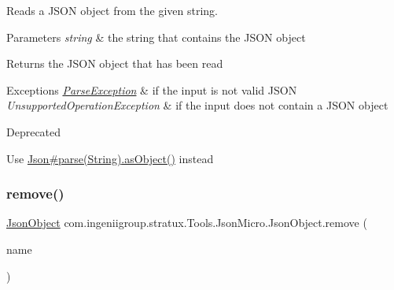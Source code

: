 Reads a J\+S\+ON object from the given string.


\begin{DoxyParams}{Parameters}
{\em string} & the string that contains the J\+S\+ON object \\
\hline
\end{DoxyParams}
\begin{DoxyReturn}{Returns}
the J\+S\+ON object that has been read 
\end{DoxyReturn}

\begin{DoxyExceptions}{Exceptions}
{\em \hyperlink{classcom_1_1ingeniigroup_1_1stratux_1_1_tools_1_1_json_micro_1_1_parse_exception}{Parse\+Exception}} & if the input is not valid J\+S\+ON \\
\hline
{\em Unsupported\+Operation\+Exception} & if the input does not contain a J\+S\+ON object \\
\hline
\end{DoxyExceptions}
\begin{DoxyRefDesc}{Deprecated}
\item[\hyperlink{deprecated__deprecated000004}{Deprecated}]Use \hyperlink{classcom_1_1ingeniigroup_1_1stratux_1_1_tools_1_1_json_micro_1_1_json_a0d4456dc115b1540337d2475ed2e3d55}{Json\#parse(\+String)}\hyperlink{classcom_1_1ingeniigroup_1_1stratux_1_1_tools_1_1_json_micro_1_1_json_value_a9b02091d2364f0e74a94ed5a6454ef9b}{.as\+Object()} instead \end{DoxyRefDesc}
\mbox{\label{classcom_1_1ingeniigroup_1_1stratux_1_1_tools_1_1_json_micro_1_1_json_object_a12f420acc06a673e3af565134a051aae}} 
\subsubsection{\texorpdfstring{remove()}{remove()}}
{\footnotesize\ttfamily \hyperlink{classcom_1_1ingeniigroup_1_1stratux_1_1_tools_1_1_json_micro_1_1_json_object}{Json\+Object} com.\+ingeniigroup.\+stratux.\+Tools.\+Json\+Micro.\+Json\+Object.\+remove (\begin{DoxyParamCaption}\item[{String}]{name }\end{DoxyParamCaption})}

